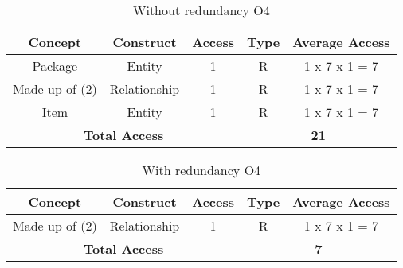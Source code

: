 \begin{table}[!h]\caption{Without redundancy O4}
	\begin{center}
		\begin{tabular}{| c | c | c | c | c |}
			\hline
			\textbf{Concept} & \textbf{Construct} & \textbf{Access} & \textbf{Type} & \textbf{Average Access} \\ \hline
			Package & Entity & 1 & R & 1 x 7 x 1 = 7 \\ \hline
			Made up of (2) & Relationship & 1 & R & 1 x 7 x 1 = 7 \\ \hline		Item & Entity & 1 & R & 1 x 7 x 1 = 7 \\ \hline		
			\multicolumn{3}{|c|}{\textbf{Total Access}} & \multicolumn{2}{|c|}{\textbf{21}} \\ \hline
		\end{tabular}
	\end{center}
\end{table}



\begin{table}[!h]\caption{With redundancy O4}
	\begin{center}
		\begin{tabular}{| c | c | c | c | c |}
			\hline
			\textbf{Concept} & \textbf{Construct} & \textbf{Access} & \textbf{Type} & \textbf{Average Access} \\ \hline
			Made up of (2) & Relationship & 1 & R & 1 x 7 x 1 = 7 \\ \hline	
			\multicolumn{3}{|c|}{\textbf{Total Access}} & \multicolumn{2}{|c|}{\textbf{7}} \\ \hline
		\end{tabular}
	\end{center}
\end{table}
